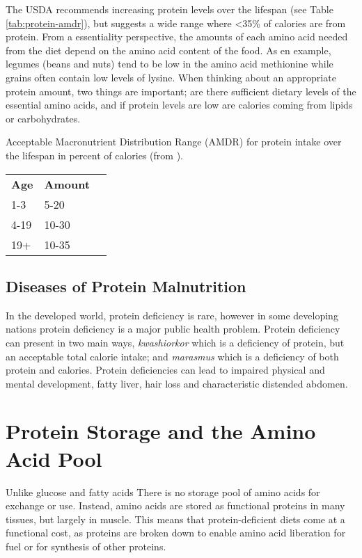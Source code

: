 \documentclass{tufte-handout}
\begin{document}
The USDA recommends increasing protein levels over the lifespan (see Table \ref{tab:protein-amdr}), but suggests a wide range where <35\% of calories are from protein.  From a essentiality perspective, the amounts of each amino acid needed from the diet depend on the amino acid content of the food.  As en example, legumes (beans and nuts) tend to be low in the amino acid methionine while grains often contain low levels of lysine.  When thinking about an appropriate protein amount, two things are important; are there sufficient dietary levels of the essential amino acids, and if protein levels are low are calories coming from lipids or carbohydrates.

\begin{margintable}
\centering
\caption{ Acceptable Macronutrient Distribution Range (AMDR) for protein intake over the lifespan in percent of calories (from \citep{USDA2015}).}
\label{tab:protein-amdr}
\begin{tabular}{lll}
\hline
\textbf {Age} & \textbf{Amount}\\
1-3 & 5-20\\
4-19 & 10-30\\
19+ & 10-35\\
\hline

\hline
\end{tabular}
\end{margintable}

\subsection{Diseases of Protein Malnutrition}

In the developed world, protein deficiency is rare, however in some developing nations protein deficiency is a major public health problem.  Protein deficiency can present in two main ways, \emph{kwashiorkor} which is a deficiency of protein, but an acceptable total calorie intake; and \emph{marasmus} which is a deficiency of both protein and calories.  Protein deficiencies can lead to impaired physical and mental development, fatty liver, hair loss and characteristic distended abdomen.

\section{Protein Storage and the Amino Acid Pool}

Unlike glucose and fatty acids  There is no storage pool of amino acids for exchange or use.  Instead, amino acids are stored as functional proteins in many tissues, but largely in muscle.  This means that protein-deficient diets come at a functional cost, as proteins are broken down to enable amino acid liberation for fuel or for synthesis of other proteins.
\end{document}
